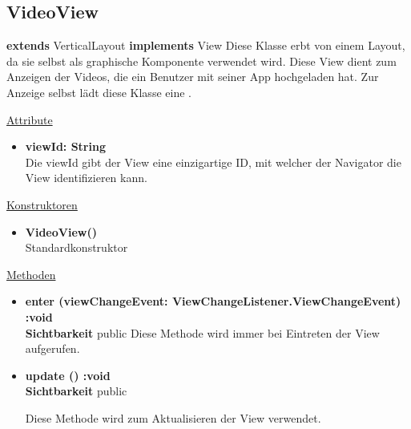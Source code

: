 \newpage
\subsection{VideoView}\label{VideoView}
\textbf{extends}  VerticalLayout \newline
\textbf{implements} View \newline
Diese Klasse erbt von einem Layout, da sie selbst als graphische Komponente verwendet wird. Diese View dient zum Anzeigen der Videos, die ein Benutzer mit seiner App hochgeladen hat. Zur Anzeige selbst lädt diese Klasse eine .
\newline

\underline{Attribute}
\begin{itemize}
\itemsep0pt
\item \textbf{viewId: String} \hfill\\ 
Die viewId gibt der View eine einzigartige ID, mit welcher der Navigator die View identifizieren kann.

\end{itemize}

\underline{Konstruktoren}
\begin{itemize}
\itemsep0pt
\item \textbf{VideoView()} \hfill\\
Standardkonstruktor
\end{itemize}

\underline{Methoden}
\begin{itemize}
\itemsep0pt
\item \textbf{enter (viewChangeEvent: ViewChangeListener.ViewChangeEvent) :void}\hfill\\
\textbf{Sichtbarkeit} public
Diese Methode wird immer bei Eintreten der View aufgerufen.

\item \textbf{update () :void}\hfill\\
\textbf{Sichtbarkeit} public

Diese Methode wird zum Aktualisieren der View verwendet.

\end{itemize}
